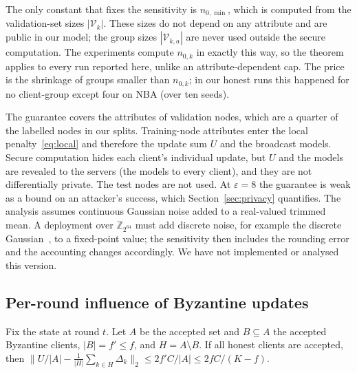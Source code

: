 \begin{remark}
The only constant that fixes the sensitivity is $n_{0,\min}$, which is computed from the validation-set sizes $|\mathcal{V}_k|$. These sizes do not depend on any attribute and are public in our model; the group sizes $|\mathcal{V}_{k,a}|$ are never used outside the secure computation. The experiments compute $n_{0,k}$ in exactly this way, so the theorem applies to every run reported here, unlike an attribute-dependent cap. The price is the shrinkage of groups smaller than $n_{0,k}$; in our honest runs this happened for no client-group except four on NBA (over ten seeds).
\end{remark}

\begin{remark}[Scope]
The guarantee covers the attributes of validation nodes, which are a quarter of the labelled nodes in our splits. Training-node attributes enter the local penalty~\eqref{eq:local} and therefore the update sum $U$ and the broadcast models. Secure computation hides each client's individual update, but $U$ and the models are revealed to the servers (the models to every client), and they are not differentially private. The test nodes are not used. At $\varepsilon=8$ the guarantee is weak as a bound on an attacker's success, which Section~\ref{sec:privacy} quantifies. The analysis assumes continuous Gaussian noise added to a real-valued trimmed mean. A deployment over $\mathbb{Z}_{2^{64}}$ must add discrete noise, for example the discrete Gaussian~\citep{canonne2020discrete,kairouz2021distributed}, to a fixed-point value; the sensitivity then includes the rounding error and the accounting changes accordingly. We have not implemented or analysed this version.
\end{remark}

\subsection{Per-round influence of Byzantine updates}

\begin{theorem}\label{thm:update}
Fix the state at round $t$. Let $A$ be the accepted set and $B\subseteq A$ the accepted Byzantine clients, $|B|=f'\le f$, and $H=A\setminus B$. If all honest clients are accepted, then $\bigl\|U/|A|-\frac{1}{|H|}\sum_{k\in H}\Delta_k\bigr\|_2\le 2f'C/|A|\le2fC/(K-f)$.
\end{theorem}

